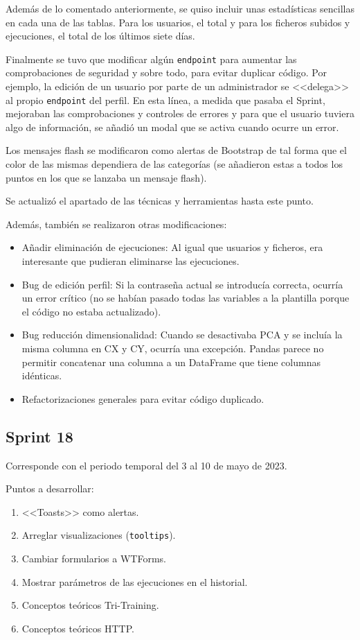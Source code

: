 Además de lo comentado anteriormente, se quiso incluir unas estadísticas
sencillas en cada una de las tablas. Para los usuarios, el total y para los
ficheros subidos y ejecuciones, el total de los últimos siete días.

Finalmente se tuvo que modificar algún \texttt{endpoint} para aumentar las
comprobaciones de seguridad y sobre todo, para evitar duplicar código. Por
ejemplo, la edición de un usuario por parte de un administrador se <<delega>> al
propio \texttt{endpoint} del perfil. En esta línea, a medida que pasaba el
Sprint, mejoraban las comprobaciones y controles de errores y para que el
usuario tuviera algo de información, se añadió un modal que se activa cuando
ocurre un error.

Los mensajes flash se modificaron como alertas de Bootstrap de tal forma que el
color de las mismas dependiera de las categorías (se añadieron estas a todos los
puntos en los que se lanzaba un mensaje flash).

Se actualizó el apartado de las técnicas y herramientas hasta este punto.

Además, también se realizaron otras modificaciones:

\begin{itemize}
    \item Añadir eliminación de ejecuciones: Al igual que usuarios y ficheros,
    era interesante que pudieran eliminarse las ejecuciones.
    \item Bug de edición perfil: Si la contraseña actual se introducía correcta,
ocurría un error crítico (no se habían pasado todas las variables a la plantilla
porque el código no estaba actualizado).
    \item Bug reducción dimensionalidad: Cuando se desactivaba PCA y se incluía
la misma columna en CX y CY, ocurría una excepción. Pandas parece no permitir
concatenar una columna a un DataFrame que tiene columnas idénticas.
    \item Refactorizaciones generales para evitar código duplicado.
\end{itemize}

\subsection{Sprint 18}
Corresponde con el periodo temporal del 3 al 10 de mayo de 2023.

Puntos a desarrollar:
\begin{enumerate}
    \item <<Toasts>> como alertas.
    \item Arreglar visualizaciones (\texttt{tooltips}).
    \item Cambiar formularios a WTForms.
    \item Mostrar parámetros de las ejecuciones en el historial.
    \item Conceptos teóricos Tri-Training.
    \item Conceptos teóricos HTTP.
\end{enumerate}

